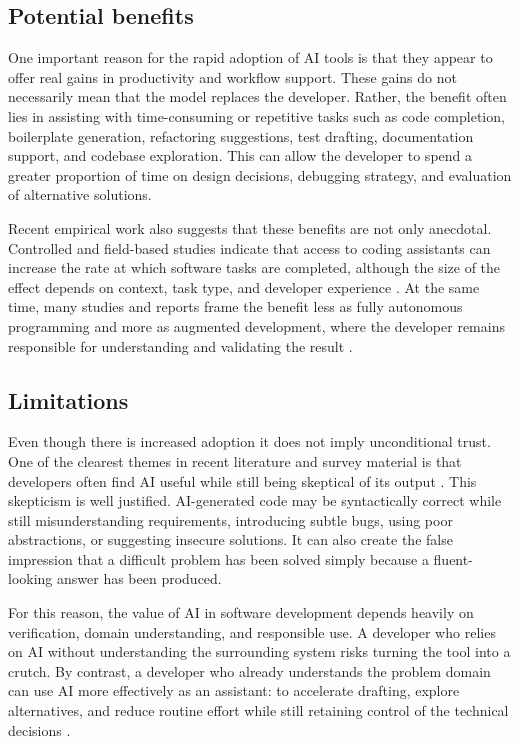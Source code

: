   \clearpage
  \subsection{Potential benefits}
  One important reason for the rapid adoption of \ac{AI} tools is that they appear to offer real gains in productivity and workflow support. These gains do not necessarily mean that the model replaces the developer. Rather, the benefit often lies in assisting with time-consuming or repetitive tasks such as code completion, boilerplate generation, refactoring suggestions, test drafting, documentation support, and codebase exploration. This can allow the developer to spend a greater proportion of time on design decisions, debugging strategy, and evaluation of alternative solutions.

  Recent empirical work also suggests that these benefits are not only anecdotal. Controlled and field-based studies indicate that access to coding assistants can increase the rate at which software tasks are completed, although the size of the effect depends on context, task type, and developer experience \cite{cuiEffectsGenerativeAI2025}. At the same time, many studies and reports frame the benefit less as fully autonomous programming and more as augmented development, where the developer remains responsible for understanding and validating the result \cite{staffSurveyRevealsAIs2023,CodexAICoding,CodexNowGenerally2026}.

  \subsection{Limitations}
  Even though there is increased adoption it does not imply unconditional trust. One of the clearest themes in recent literature and survey material is that developers often find \ac{AI} useful while still being skeptical of its output \cite{AI2024Stack,wangInvestigatingDesigningTrust2023}. This skepticism is well justified. \ac{AI}-generated code may be syntactically correct while still misunderstanding requirements, introducing subtle bugs, using poor abstractions, or suggesting insecure solutions. It can also create the false impression that a difficult problem has been solved simply because a fluent-looking answer has been produced.

  For this reason, the value of \ac{AI} in software development depends heavily on verification, domain understanding, and responsible use. A developer who relies on \ac{AI} without understanding the surrounding system risks turning the tool into a crutch. By contrast, a developer who already understands the problem domain can use \ac{AI} more effectively as an assistant: to accelerate drafting, explore alternatives, and reduce routine effort while still retaining control of the technical decisions \cite{wangInvestigatingDesigningTrust2023}.

